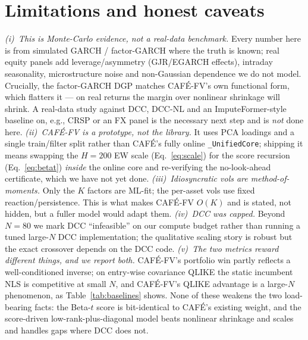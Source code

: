 \documentclass[10pt,twocolumn]{article}
\newcommand{\cafe}{CAF\'E}
\newcommand{\fv}{\cafe{}-FV}
\begin{document}
\section{Limitations and honest caveats}\label{sec:limits}
\emph{(i)~This is Monte-Carlo evidence, not a real-data benchmark.} Every number here
is from simulated GARCH / factor-GARCH where the truth is known; real equity panels add
leverage/asymmetry (GJR/EGARCH effects), intraday seasonality, microstructure noise and
non-Gaussian dependence we do not model. Crucially, the factor-GARCH DGP matches \fv{}'s
own functional form, which flatters it --- on real returns the margin over nonlinear
shrinkage will shrink. A real-data study against DCC, DCC-NL and an ImputeFormer-style
baseline on, e.g., CRSP or an FX panel is the necessary next step and is \emph{not} done
here. \emph{(ii)~\fv{} is a prototype, not the library.} It uses PCA loadings and a single
train/filter split rather than \cafe{}'s fully online \texttt{\_UnifiedCore}; shipping it
means swapping the $H=200$ EW scale (Eq.~\ref{eq:scale}) for the score recursion
(Eq.~\ref{eq:betat}) \emph{inside} the online core and re-verifying the no-look-ahead
certificate, which we have not yet done. \emph{(iii)~Idiosyncratic vols are
method-of-moments.} Only the $K$ factors are ML-fit; the per-asset vols use fixed
reaction/persistence. This is what makes \fv{} $O(K)$ and is stated, not hidden, but a
fuller model would adapt them. \emph{(iv)~DCC was capped.} Beyond $N=80$ we mark DCC
``infeasible'' on our compute budget rather than running a tuned large-$N$ DCC
implementation; the qualitative scaling story is robust but the exact crossover depends on
the DCC code. \emph{(v)~The two metrics reward different things, and we report both.}
\fv{}'s portfolio win partly reflects a well-conditioned inverse; on entry-wise covariance
QLIKE the static incumbent NLS is competitive at small $N$, and \fv{}'s QLIKE advantage is
a large-$N$ phenomenon, as Table~\ref{tab:baselines} shows. None of these weakens the two
load-bearing facts: the Beta-$t$ score is bit-identical to \cafe{}'s existing weight, and
the score-driven low-rank-plus-diagonal model beats nonlinear shrinkage and scales and
handles gaps where DCC does not.
\end{document}
